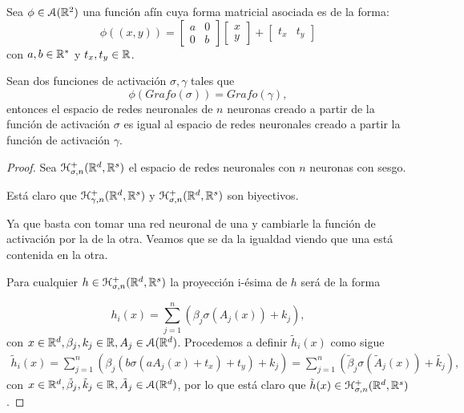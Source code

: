 \begin{aportacionOriginal}

\begin{teorema}\label{teo:eficacia-funciones-activation}
    \label{teo:equivalencia-grafos-activation-function}
    Sea $\phi \in \mathcal{A}(\mathbb{R}^2)$ una función afín 
    cuya forma matricial asociada es de la forma:  
    \begin{equation}
        \phi((x,y)) =  
        \begin{bmatrix}
            a & 0 \\
             0& b 
        \end{bmatrix}
        \begin{bmatrix}
            x \\
            y
        \end{bmatrix}
        +
        \begin{bmatrix}
            t_x  & t_y
        \end{bmatrix}
    \end{equation}
    con $a,b \in \mathbb{R}^*$ y $t_x, t_y \in \mathbb{R}$.

    Sean dos funciones de activación $\sigma, \gamma$ tales que 
    \begin{equation*}
        \phi(Grafo(\sigma)) = Grafo(\gamma),
    \end{equation*}
    entonces 
    el espacio de redes neuronales de $n$ neuronas creado a partir de la función de activación $\sigma$ es  
    igual al espacio de redes neuronales creado a partir la función de activación $\gamma$. 
\end{teorema}
\begin{proof}
    Sea $\mathcal{H}^+_{\sigma, n}(\mathbb{R}^d, \mathbb{R}^s)$ el espacio de redes neuronales con $n$ neuronas con sesgo. 

    Está claro que 
    $\mathcal{H}^+_{\gamma, n}(\mathbb{R}^d, \mathbb{R}^s)$ 
        y 
        $\mathcal{H}^+_{\sigma, n}(\mathbb{R}^d, \mathbb{R}^s)$ 
        son biyectivos.
   
    Ya que basta con tomar una red neuronal de una y cambiarle la función de activación por la de la otra. 
    Veamos 
    que se da la igualdad viendo que una está contenida en la otra. 

    Para cualquier $h  \in \mathcal{H}^+_{\sigma, n}(\mathbb{R}^d, \mathbb{R}^s)$
    la proyección i-ésima de $h$ será de la forma 

    \begin{equation*}
        h_i(x) = \sum^n_{j=1}(\beta_{j} \sigma(A_j(x))+ k_j),
    \end{equation*}
    con $x \in \mathbb{R}^d, \beta_{j}, k_j \in \mathbb{R}, A_j \in \mathcal{A}(\mathbb{R}^d)$. 
    Procedemos a definir $\tilde{h}_i(x)$ como sigue 
    \begin{align}\label{eq:h-tilda-definition}
        \tilde{h}_i(x) 
        = \sum^n_{j=1}(\beta_{j}  (b \sigma( a A_j(x) + t_x) + t_y)+ k_j)
        = \sum^n_{j=1}(\tilde{\beta}_{j} \sigma(\tilde{A}_j(x))+ \tilde{k_j}),
    \end{align}
    con $x \in \mathbb{R}^d, \tilde \beta_{j}, \tilde k_j \in \mathbb{R}, \tilde{A}_j \in \mathcal{A}(\mathbb{R}^d)$,
    por lo que está claro que $\tilde{h}(x) \in \mathcal{H}^+_{\sigma, n}(\mathbb{R}^d, \mathbb{R}^s)$. 
 

\end{proof}
\end{aportacionOriginal}
